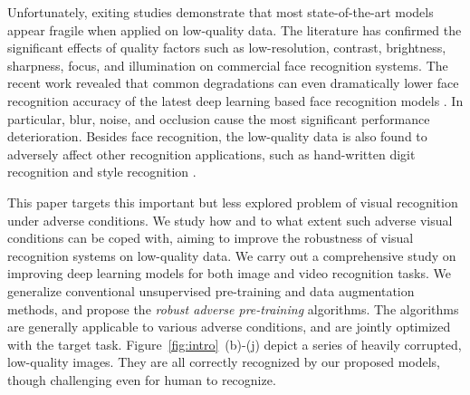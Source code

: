 \documentclass[10pt,twocolumn,twoside]{IEEEtran} %
\begin{document}
Unfortunately, exiting studies demonstrate that most state-of-the-art models appear fragile when applied on low-quality data.
The literature \cite{DVS12, ab14} has confirmed the significant effects of quality factors such as low-resolution, contrast, brightness, sharpness, focus, and illumination on commercial face recognition systems. 
The recent work \cite{karahan2016image} revealed that common degradations can even dramatically lower face recognition accuracy of the latest deep learning based face recognition models \cite{Alex, parkhi2015deep, szegedy2015going}. 
In particular, blur, noise, and %
occlusion cause the most significant performance deterioration.
Besides face recognition, the low-quality data is also found to adversely affect other recognition applications, such as hand-written digit recognition \cite{basu2015learning} and style recognition \cite{vlrr}. 

 
This paper targets this important but less explored problem of visual recognition under adverse conditions. 
We study how and to what extent such adverse visual conditions can be coped with, aiming to improve the robustness of visual recognition systems on low-quality data. 
We carry out a comprehensive study on improving deep learning models for both image and video recognition tasks. 
We generalize conventional unsupervised pre-training and data augmentation methods, and propose the \textit{robust adverse pre-training} algorithms. 
The algorithms are generally applicable to various adverse conditions, and are jointly optimized with the target task. 
Figure~\ref{fig:intro}~(b)-(j) depict a series of heavily corrupted, low-quality images.  
They are all correctly recognized by our proposed models, though challenging even for human to recognize.
\end{document}
